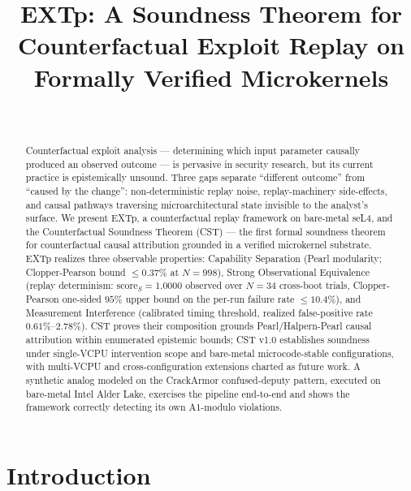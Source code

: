 \documentclass[conference]{IEEEtran}
\newcommand{\scoreS}{\text{score}_S}
\begin{document}
\title{EXTp: A Soundness Theorem for Counterfactual Exploit Replay on Formally Verified Microkernels}

\author{\\
}

\maketitle

\begin{abstract}
Counterfactual exploit analysis --- determining which input
parameter causally produced an observed outcome --- is pervasive
in security research, but its current practice is epistemically
unsound. Three gaps separate ``different outcome'' from ``caused
by the change'': non-deterministic replay noise, replay-machinery
side-effects, and causal pathways traversing microarchitectural
state invisible to the analyst's surface. We present EXTp, a
counterfactual replay framework on bare-metal seL4, and the
Counterfactual Soundness Theorem (CST) --- the first formal
soundness theorem for counterfactual causal attribution grounded
in a verified microkernel substrate. EXTp realizes three
observable properties: Capability
Separation (Pearl modularity; Clopper-Pearson bound
${\leq}0.37\%$ at $N{=}998$), Strong Observational Equivalence
(replay determinism: $\scoreS{=}1.0000$ observed over $N{=}34$
cross-boot trials, Clopper-Pearson one-sided $95\%$ upper bound on
the per-run failure rate ${\leq}10.4\%$), and Measurement
Interference (calibrated timing threshold,
realized false-positive rate $0.61\%$--$2.78\%$). CST proves their
composition grounds Pearl/Halpern-Pearl causal attribution within
enumerated epistemic bounds; CST v1.0 establishes soundness under
single-VCPU intervention scope and bare-metal microcode-stable
configurations, with multi-VCPU and cross-configuration extensions
charted as future work. A synthetic analog modeled on the
CrackArmor confused-deputy pattern, executed on bare-metal Intel
Alder Lake, exercises the pipeline end-to-end and shows the
framework correctly detecting its own A1-modulo violations.
\end{abstract}

\section{Introduction}\label{sec:intro}
\end{document}
